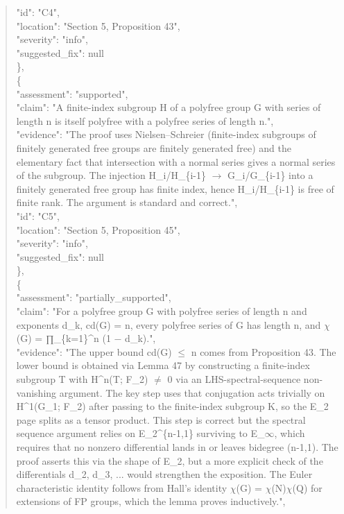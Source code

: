 \documentclass[11pt]{article}
\begin{document}
\begin{quote}
      "id": "C4",\\
      "location": "Section 5, Proposition 43",\\
      "severity": "info",\\
      "suggested\_fix": null\\
    \},\\
    \{\\
      "assessment": "supported",\\
      "claim": "A finite-index subgroup H of a polyfree group G with series of length n is itself polyfree with a polyfree series of length n.",\\
      "evidence": "The proof uses Nielsen--Schreier (finite-index subgroups of finitely generated free groups are finitely generated free) and the elementary fact that intersection with a normal series gives a normal series of the subgroup. The injection H\_i/H\_\{i-1\} \ensuremath{\to} G\_i/G\_\{i-1\} into a finitely generated free group has finite index, hence H\_i/H\_\{i-1\} is free of finite rank. The argument is standard and correct.",\\
      "id": "C5",\\
      "location": "Section 5, Proposition 45",\\
      "severity": "info",\\
      "suggested\_fix": null\\
    \},\\
    \{\\
      "assessment": "partially\_supported",\\
      "claim": "For a polyfree group G with polyfree series of length n and exponents d\_k, cd(G) = n, every polyfree series of G has length n, and \ensuremath{\chi}(G) = ∏\_\{k=1\}\^{}n (1 \ensuremath{-} d\_k).",\\
      "evidence": "The upper bound cd(G) \ensuremath{\le} n comes from Proposition 43. The lower bound is obtained via Lemma 47 by constructing a finite-index subgroup T with H\^{}n(T; F\_2) \ensuremath{\ne} 0 via an LHS-spectral-sequence non-vanishing argument. The key step uses that conjugation acts trivially on H\^{}1(G\_1; F\_2) after passing to the finite-index subgroup K, so the E\_2 page splits as a tensor product. This step is correct but the spectral sequence argument relies on E\_2\^{}\{n-1,1\} surviving to E\_\ensuremath{\infty}, which requires that no nonzero differential lands in or leaves bidegree (n-1,1). The proof asserts this via the shape of E\_2, but a more explicit check of the differentials d\_2, d\_3, ... would strengthen the exposition. The Euler characteristic identity follows from Hall's identity \ensuremath{\chi}(G) = \ensuremath{\chi}(N)\ensuremath{\chi}(Q) for extensions of FP groups, which the lemma proves inductively.",\\

\end{quote}
\end{document}
